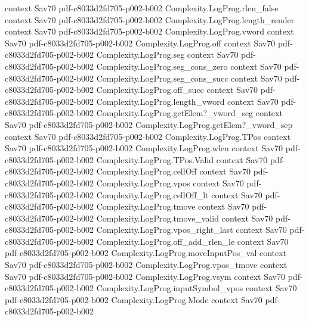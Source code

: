 \begin{theorem}
  {context}
  {Sav70}
  {pdf-c8033d2fd705-p002-b002}
\proofstep
  {Complexity.LogProg.rlen_false}
  {context}
  {Sav70}
  {pdf-c8033d2fd705-p002-b002}
\proofstep
  {Complexity.LogProg.length_render}
  {context}
  {Sav70}
  {pdf-c8033d2fd705-p002-b002}
\proofstep
  {Complexity.LogProg.vword}
  {context}
  {Sav70}
  {pdf-c8033d2fd705-p002-b002}
\proofstep
  {Complexity.LogProg.off}
  {context}
  {Sav70}
  {pdf-c8033d2fd705-p002-b002}
\proofstep
  {Complexity.LogProg.seg}
  {context}
  {Sav70}
  {pdf-c8033d2fd705-p002-b002}
\proofstep
  {Complexity.LogProg.seg_cons_zero}
  {context}
  {Sav70}
  {pdf-c8033d2fd705-p002-b002}
\proofstep
  {Complexity.LogProg.seg_cons_succ}
  {context}
  {Sav70}
  {pdf-c8033d2fd705-p002-b002}
\proofstep
  {Complexity.LogProg.off_succ}
  {context}
  {Sav70}
  {pdf-c8033d2fd705-p002-b002}
\proofstep
  {Complexity.LogProg.length_vword}
  {context}
  {Sav70}
  {pdf-c8033d2fd705-p002-b002}
\proofstep
  {Complexity.LogProg.getElem?_vword_seg}
  {context}
  {Sav70}
  {pdf-c8033d2fd705-p002-b002}
\proofstep
  {Complexity.LogProg.getElem?_vword_sep}
  {context}
  {Sav70}
  {pdf-c8033d2fd705-p002-b002}
\proofstep
  {Complexity.LogProg.TPos}
  {context}
  {Sav70}
  {pdf-c8033d2fd705-p002-b002}
\proofstep
  {Complexity.LogProg.wlen}
  {context}
  {Sav70}
  {pdf-c8033d2fd705-p002-b002}
\proofstep
  {Complexity.LogProg.TPos.Valid}
  {context}
  {Sav70}
  {pdf-c8033d2fd705-p002-b002}
\proofstep
  {Complexity.LogProg.cellOff}
  {context}
  {Sav70}
  {pdf-c8033d2fd705-p002-b002}
\proofstep
  {Complexity.LogProg.vpos}
  {context}
  {Sav70}
  {pdf-c8033d2fd705-p002-b002}
\proofstep
  {Complexity.LogProg.cellOff_lt}
  {context}
  {Sav70}
  {pdf-c8033d2fd705-p002-b002}
\proofstep
  {Complexity.LogProg.tmove}
  {context}
  {Sav70}
  {pdf-c8033d2fd705-p002-b002}
\proofstep
  {Complexity.LogProg.tmove_valid}
  {context}
  {Sav70}
  {pdf-c8033d2fd705-p002-b002}
\proofstep
  {Complexity.LogProg.vpos_right_last}
  {context}
  {Sav70}
  {pdf-c8033d2fd705-p002-b002}
\proofstep
  {Complexity.LogProg.off_add_rlen_le}
  {context}
  {Sav70}
  {pdf-c8033d2fd705-p002-b002}
\proofstep
  {Complexity.LogProg.moveInputPos_val}
  {context}
  {Sav70}
  {pdf-c8033d2fd705-p002-b002}
\proofstep
  {Complexity.LogProg.vpos_tmove}
  {context}
  {Sav70}
  {pdf-c8033d2fd705-p002-b002}
\proofstep
  {Complexity.LogProg.vsym}
  {context}
  {Sav70}
  {pdf-c8033d2fd705-p002-b002}
\proofstep
  {Complexity.LogProg.inputSymbol_vpos}
  {context}
  {Sav70}
  {pdf-c8033d2fd705-p002-b002}
\proofstep
  {Complexity.LogProg.Mode}
  {context}
  {Sav70}
  {pdf-c8033d2fd705-p002-b002}
\proofstep

\end{theorem}
